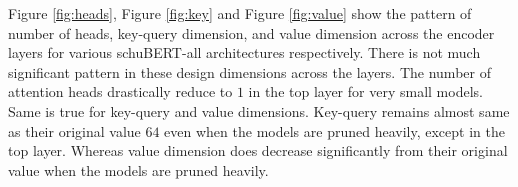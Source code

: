 \documentclass[11pt,a4paper]{article}
\begin{document}

Figure \ref{fig:heads}, Figure \ref{fig:key} and Figure \ref{fig:value} show the pattern of number of heads, key-query dimension, and value dimension across the encoder layers for various schuBERT-all architectures respectively. There is not much significant pattern in these design dimensions across the layers. The number of attention heads drastically reduce to $1$ in the top layer for very small models. Same is true for key-query and value dimensions. 
Key-query remains almost same as their original value $64$ even when the models are pruned heavily, except in the top layer. Whereas value dimension does decrease significantly from their original value when the models are pruned heavily. 
\end{document}
